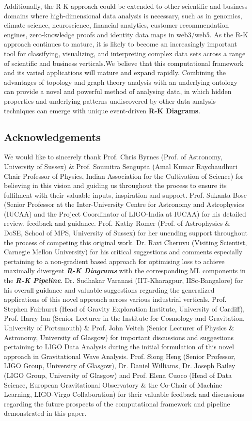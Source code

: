 Additionally, the R-K approach could be extended to other scientific and business domains where high-dimensional data analysis is necessary, such as in genomics, climate science,  neuroscience, financial analytics, customer recommendation engines, zero-knowledge proofs and identity data maps in web3/web5. As the R-K approach continues to mature, it is likely to become an increasingly important tool for classifying, visualizing, and interpreting complex data sets across a range of scientific and business verticals.We believe that this computational framework and its varied applications will mature and expand rapidly. Combining the advantages of topology and graph theory analysis with an underlying ontology can provide a novel and powerful method of analysing data, in which hidden properties and underlying patterns undiscovered by other data analysis techniques can emerge with unique event-driven \textbf{R-K Diagrams}.

\subsection{Acknowledgements}

We would like to sincerely thank Prof. Chris Byrnes (Prof. of Astronomy, University of Sussex) \& Prof. Soumitra Sengupta (Amal Kumar Raychaudhuri Chair Professor of Physics, Indian Association for the Cultivation of Science) for  believing in this vision and guiding us throughout the process to ensure its fulfilment with their valuable inputs, inspiration and support. Prof. Sukanta Bose (Senior Professor at the Inter-University Centre for Astronomy and Astrophysics (IUCAA) and the Project Coordinator of LIGO-India at IUCAA) for his detailed review, feedback and guidance. Prof. Kathy Romer (Prof. of Astrophysics \& DoSE, School of MPS, University of Sussex) for her unending support throughout the process of competing this original work. Dr. Ravi Cheruvu (Visiting Scientist, Carnegie Mellon University) for his critical suggestions and comments especially pertaining to a non-gradient based approach for optimising loss to achieve maximally divergent \textbf{\textit{R-K Diagrams}} with the corresponding ML components in the \textbf{\textit{R-K Pipeline}}. Dr. Sudhakar Varanasi (IIT-Kharagpur, IISc-Bangalore) for his overall guidance and valuable suggestions regarding the generalized applications of this novel approach across various industrial verticals. Prof. Stephen Fairhurst (Head of Gravity Exploration Institute, University of Cardiff), Prof. Harry Ian (Senior Lecturer in the Institute for Cosmology and Gravitation, University of Portsmouth) \& Prof. John Veitch (Senior Lecturer of Physics \& Astronomy, University of Glasgow) for important discussions and suggestions pertaining to LIGO Data Analysis during the initial formulation of this novel approach in Gravitational Wave Analysis. Prof. Siong Heng (Senior Professor, LIGO Group, University of Glasgow), Dr. Daniel Williams, Dr. Joseph Bailey (LIGO Group, University of Glasgow) and Prof. Elena Cuoco (Head of Data Science, European Gravitational Observatory \& the Co-Chair of Machine Learning, LIGO-Virgo Collaboration) for their valuable feedback and discussions regarding the future prospects of the computational framework and pipeline demonstrated in this paper.
